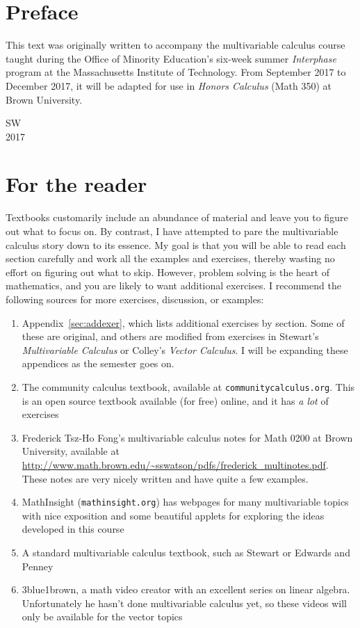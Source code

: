 \documentclass{watsonbook}
\begin{document}
 



\chapter*{Preface} 

\pagecolor{white} 

This text was originally written to accompany the multivariable
calculus course taught during the Office of Minority Education's
six-week summer \textit{Interphase} program at the Massachusetts
Institute of Technology. From September 2017 to December 2017, it will
be adapted for use in \textit{Honors Calculus} (Math 350) at Brown
University. 


SW \\
2017

\chapter*{For the reader}

Textbooks customarily include an abundance of material and leave you
to figure out what to focus on. By contrast, I have attempted to pare
the multivariable calculus story down to its essence. My goal is that
you will be able to read each section carefully and work all the
examples and exercises, thereby wasting no effort on figuring out what
to skip. However, problem solving is the heart of mathematics, and you
are likely to want additional exercises. I recommend the following
sources for more exercises, discussion, or examples: 
\begin{enumerate}[itemsep = 3pt]
\item Appendix~\ref{sec:addexer}, which lists additional exercises by
  section. Some of these are original, and others are
  modified from exercises in 
  Stewart's \textit{Multivariable Calculus} or Colley's \textit{Vector
    Calculus}. I will be expanding these appendices as the semester
  goes on. 
\item The community calculus textbook, available at
  \texttt{communitycalculus.org}. This is an open source textbook available (for
  free) online, and it has \textit{a lot} of exercises 
\item Frederick Tsz-Ho Fong's multivariable calculus notes for Math 0200 at
  Brown University, available at
  \href{http://www.math.brown.edu/~sswatson/pdfs/frederick_multinotes.pdf}{\url{http://www.math.brown.edu/~sswatson/pdfs/frederick\_multinotes.pdf}}. These
  notes are very nicely written and have quite a few examples. 
\item MathInsight (\texttt{mathinsight.org}) has webpages for many
  multivariable topics with nice exposition and some beautiful applets for exploring the
  ideas developed in this course
\item A standard multivariable calculus textbook, such as Stewart
  or Edwards and Penney
\item 3blue1brown, a math video creator with an excellent series on
  linear algebra. Unfortunately he hasn't done multivariable calculus
  yet, so these videos will only be available for the vector topics
 \end{enumerate}
\end{document}
